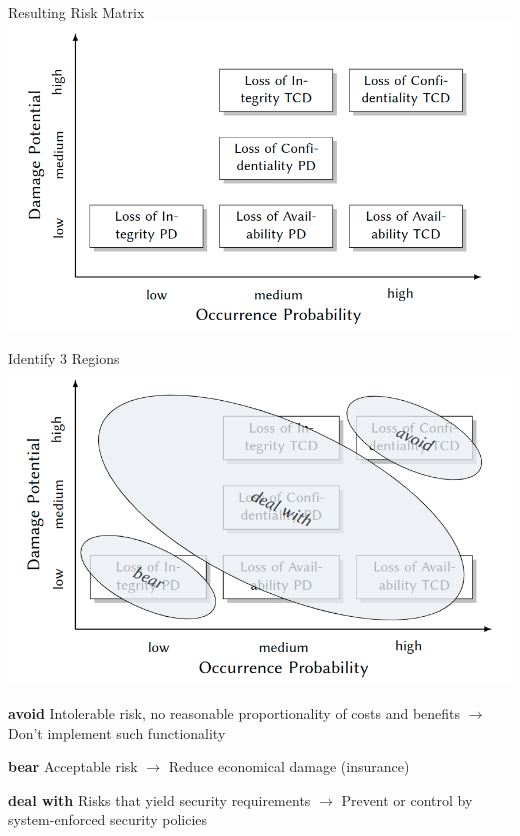 \documentclass[a4paper]{article}
\begin{document}
\begin{multicols}{3}
    \begin{multicols*}{2}
        \begin{center}
            Resulting Risk Matrix
            \includegraphics[width=.9\linewidth]{Assets/Systemsicherheit-risk-matrix-1.png}
        \end{center}
        \begin{center}
            Identify 3 Regions
            \includegraphics[width=.9\linewidth]{Assets/Systemsicherheit-Risk-Matrix-2.png}
        \end{center}
    \end{multicols*}
    \begin{itemize*}
        \item \textbf{avoid} Intolerable risk, no reasonable proportionality of costs and benefits $\rightarrow$ Don’t implement such functionality
        \item \textbf{bear} Acceptable risk $\rightarrow$ Reduce economical damage (insurance)
        \item \textbf{deal with} Risks that yield security requirements $\rightarrow$ Prevent or control by system-enforced security policies
    \end{itemize*}


\end{multicols}
\end{document}
